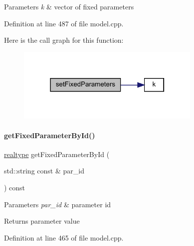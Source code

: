 \begin{DoxyParams}{Parameters}
{\em k} & vector of fixed parameters \\
\hline
\end{DoxyParams}


Definition at line 487 of file model.\+cpp.

Here is the call graph for this function\+:
\nopagebreak
\begin{figure}[H]
\begin{center}
\leavevmode
\includegraphics[width=250pt]{classamici_1_1_model_a14ba63ae81b4e8fa1f46884b703e2c30_cgraph}
\end{center}
\end{figure}
\mbox{\label{classamici_1_1_model_acc647ebbeaf0be737c7c165fa77eeca5}} 
\paragraph{\texorpdfstring{get\+Fixed\+Parameter\+By\+Id()}{getFixedParameterById()}}
{\footnotesize\ttfamily \mbox{\hyperlink{namespaceamici_a1bdce28051d6a53868f7ccbf5f2c14a3}{realtype}} get\+Fixed\+Parameter\+By\+Id (\begin{DoxyParamCaption}\item[{std\+::string const \&}]{par\+\_\+id }\end{DoxyParamCaption}) const}


\begin{DoxyParams}{Parameters}
{\em par\+\_\+id} & parameter id \\
\hline
\end{DoxyParams}
\begin{DoxyReturn}{Returns}
parameter value 
\end{DoxyReturn}


Definition at line 465 of file model.\+cpp.

